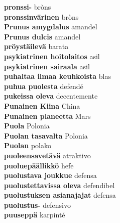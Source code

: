 \textbf{ pronssi-  } bròns \\
\textbf{ pronssinvärinen  } bròns \\
\textbf{ Prunus amygdalus  } amandel \\
\textbf{ Prunus dulcis  } amandel \\
\textbf{ pröystäilevä  } barata \\
\textbf{ psykiatrinen hoitolaitos  } asil \\
\textbf{ psykiatrinen sairaala  } asil \\
\textbf{ puhaltaa ilmaa keuhkoista  } blas \\
\textbf{ puhua puolesta  } defendé \\
\textbf{ pukeissa oleva  } decentemente \\
\textbf{ Punainen Kiina  } China \\
\textbf{ Punainen planeetta  } Mars \\
\textbf{ Puola  } Polonia \\
\textbf{ Puolan tasavalta  } Polonia \\
\textbf{ Puolan  } polako \\
\textbf{ puoleensavetävä  } atraktivo \\
\textbf{ puoluepäällikkö  } hefe \\
\textbf{ puolustava joukkue  } defensa \\
\textbf{ puolustettavissa oleva  } defendibel \\
\textbf{ puolustuksen asianajajat  } defensa \\
\textbf{ puolustus-  } defensivo \\
\textbf{ puuseppä  } karpinté \\
